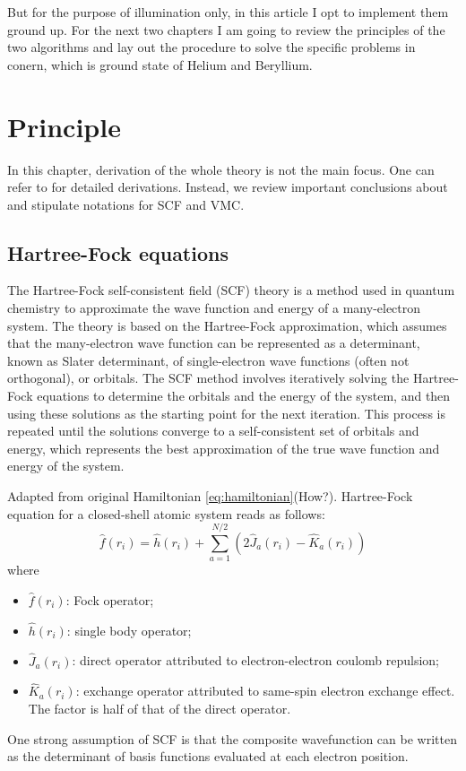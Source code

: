 \documentclass[11pt]{article}
\begin{document}
But for the purpose of illumination only, in this article I opt to implement them ground up. For the next two chapters I am going to review the principles of the two algorithms and lay out the procedure to solve the specific problems in conern, which is ground state of Helium and Beryllium.

\section{Principle}
In this chapter, derivation of the whole theory is not the main focus. One can refer to \cite{Derivation_of_Fock_matrix} \cite{Review_of_VMC} for detailed derivations. Instead, we review important conclusions about and stipulate notations for SCF and VMC.
\subsection{Hartree-Fock equations}
The Hartree-Fock self-consistent field (SCF) theory is a method used in quantum chemistry to approximate the wave function and energy of a many-electron system. 
The theory is based on the Hartree-Fock approximation, which assumes that the many-electron wave function can be represented as a determinant, known as Slater determinant, of single-electron wave functions (often not orthogonal), or orbitals. 
The SCF method involves iteratively solving the Hartree-Fock equations to determine the orbitals and the energy of the system, and then using these solutions as the starting point for the next iteration. 
This process is repeated until the solutions converge to a self-consistent set of orbitals and energy, which represents the best approximation of the true wave function and energy of the system.

Adapted from original Hamiltonian \ref{eq:hamiltonian}(How?). Hartree-Fock equation for a closed-shell atomic system reads as follows:
\cite{Fock_matrix_source}
\begin{equation}
\label{eq:hartree-fock}
\hat{f}(r_i) = \hat{h}(r_i)+\sum_{a=1}^{N/2}(2\hat{J}_a(r_i)-\hat{K}_a(r_i))
\end{equation}
where
\begin{itemize}
    \item $\hat{f}(r_i)$: Fock operator;
    \item $\hat{h}(r_i)$: single body operator;
    \item $\hat{J}_a(r_i)$: direct operator attributed to electron-electron coulomb repulsion;
    \item $\hat{K}_a(r_i)$: exchange operator attributed to same-spin electron exchange effect. The factor is half of that of the direct operator. 
\end{itemize}
One strong assumption of SCF is that the composite wavefunction can be written as the determinant of basis functions evaluated at each electron position. 
\end{document}

